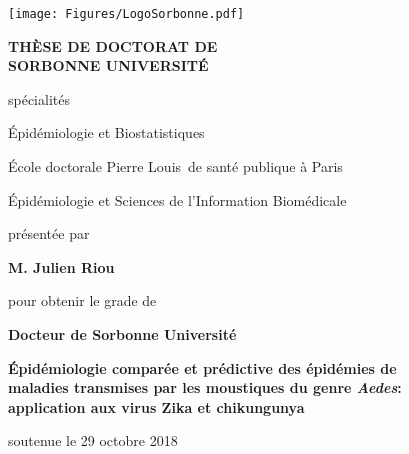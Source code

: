 \documentclass[a4paper,12pt]{book}
\numberwithin{equation}{chapter}
\numberwithin{figure}{chapter}
\numberwithin{table}{chapter}
\begin{document}
\frontmatter %
\thispagestyle{empty}


\texttt{[image: Figures/LogoSorbonne.pdf]}

\begin{center}
\vspace*{.4cm}

{\bf  TH\`ESE DE DOCTORAT DE \\[.5em] SORBONNE UNIVERSITÉ }

\vspace*{.6cm}
spécialités 
 
Épidémiologie et Biostatistiques


\vspace*{.6cm}
École doctorale \guillemotleft Pierre Louis\guillemotright\ de santé publique à Paris

{\small Épidémiologie et Sciences de l'Information Biomédicale}

\vspace*{.8cm}
présentée par

\vspace*{0.2cm}
{\bf M. Julien Riou}

\vspace*{.6cm}
pour obtenir le grade de

\vspace*{0.2cm}
{\bf Docteur de Sorbonne Université}

\vspace*{.8cm}
\begin{flushleft}
	\underline{}
\end{flushleft}

{\bf Épidémiologie comparée et prédictive des épidémies de \\
\vspace*{0.2cm}
maladies transmises par les moustiques du genre {\em Aedes}: \\
\vspace*{0.2cm}
application aux virus Zika et chikungunya}

\end{center}

\vspace*{.6cm} 
soutenue le 29 octobre 2018
\end{document}
